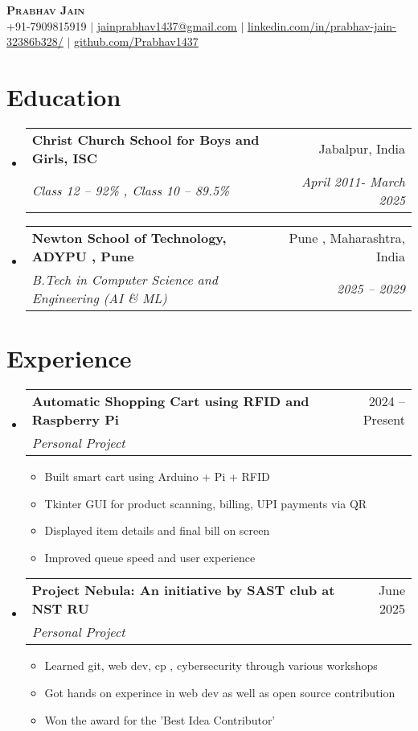 \documentclass[letterpaper,11pt]{article}
\makeatletter
\newcommand{\resumeItem}[1]{
  \item\small{
    {#1 \vspace{-2pt}}
  }
}
\newcommand{\resumeSubheading}[4]{
  \vspace{-2pt}\item
    \begin{tabular*}{0.97\textwidth}[t]{l@{\extracolsep{\fill}}r}
      \textbf{#1} & #2 \\
      \textit{\small#3} & \textit{\small #4} \\
    \end{tabular*}\vspace{-7pt}
}
\newcommand{\resumeSubHeadingListStart}{\begin{itemize}[leftmargin=0.15in, label={}]}
\newcommand{\resumeSubHeadingListEnd}{\end{itemize}}
\newcommand{\resumeItemListStart}{\begin{itemize}}
\newcommand{\resumeItemListEnd}{\end{itemize}\vspace{-5pt}}
\makeatother
\begin{document}
\begin{center}
    \textbf{\Huge \scshape Prabhav Jain} \\ \vspace{1pt}
    \small +91-7909815919 $|$ \href{mailto:prabhavjainofficial@gmail.com}{\underline{jainprabhav1437@gmail.com}} $|$ 
    \href{linkedin.com/in/prabhav-jain-32386b328/}{\underline{linkedin.com/in/prabhav-jain-32386b328/}} $|$
    \href{https://github.com/Prabhav1437}{\underline{github.com/Prabhav1437}}
\end{center}

\section{Education}
  \resumeSubHeadingListStart
    \resumeSubheading
      {Christ Church School for Boys and Girls, ISC}{Jabalpur, India}
      {Class 12 – 92\% , Class 10 – 89.5\%}{April 2011- March 2025}{}
    \resumeSubheading
      {Newton School of Technology, ADYPU , Pune}{Pune , Maharashtra, India}
      {B.Tech in Computer Science and Engineering (AI \& ML)}{2025 -- 2029}
  \resumeSubHeadingListEnd

\section{Experience}
  \resumeSubHeadingListStart

    \resumeSubheading
      {Automatic Shopping Cart using RFID and Raspberry Pi}{2024 -- Present}
      {Personal Project}{}
      \resumeItemListStart
        \resumeItem{Built smart cart using Arduino + Pi + RFID}
        \resumeItem{Tkinter GUI for product scanning, billing, UPI payments via QR}
        \resumeItem{Displayed item details and final bill on screen}
        \resumeItem{Improved queue speed and user experience}
      \resumeItemListEnd

    \resumeSubheading
      {Project Nebula: An initiative by SAST club at NST RU}{June 2025}
      {Personal Project}{}
      \resumeItemListStart
        \resumeItem{Learned git, web dev, cp , cybersecurity through various workshops}
        \resumeItem{Got hands on experince in web dev as well as open source contribution}
        \resumeItem{Won the award for the 'Best Idea Contributor'}
      \resumeItemListEnd

  \resumeSubHeadingListEnd
\end{document}

